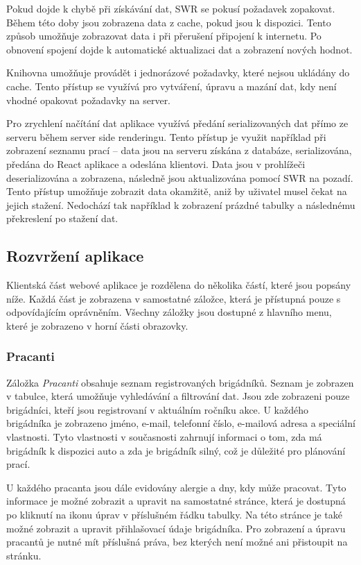 Pokud dojde k chybě při získávání dat, SWR se pokusí požadavek zopakovat. Během této doby jsou zobrazena data z cache, pokud jsou k dispozici. Tento způsob
umožňuje zobrazovat data i při přerušení připojení k internetu. Po obnovení spojení dojde k automatické aktualizaci dat a zobrazení nových hodnot.

Knihovna umožňuje provádět i jednorázové požadavky, které nejsou ukládány do cache. Tento přístup se využívá pro vytváření, úpravu a mazání dat, kdy není vhodné
opakovat požadavky na server.

Pro zrychlení načítání dat aplikace využívá předání serializovaných dat přímo ze serveru během server side renderingu. Tento přístup je využit například při
zobrazení seznamu prací -- data jsou na serveru získána z databáze, serializována, předána do React aplikace a odeslána klientovi.
Data jsou v prohlížeči deserializována a zobrazena, následně jsou aktualizována pomocí SWR na pozadí. Tento přístup umožňuje zobrazit data okamžitě, aniž by
uživatel musel čekat na jejich stažení. Nedochází tak například k zobrazení prázdné tabulky a následnému překreslení po stažení dat.

\subsection{Rozvržení aplikace}

Klientská část webové aplikace je rozdělena do několika částí, které jsou popsány níže. Každá část je zobrazena v samostatné záložce, která je přístupná
pouze s odpovídajícím oprávněním. Všechny záložky jsou dostupné z hlavního menu, které je zobrazeno v horní části obrazovky.

\subsubsection{Pracanti}

Záložka \textit{Pracanti} obsahuje seznam registrovaných brigádníků. Seznam je zobrazen v tabulce, která umožňuje vyhledávání a filtrování dat.
Jsou zde zobrazeni pouze brigádníci, kteří jsou registrovaní v aktuálním ročníku akce. U každého brigádníka je zobrazeno jméno, e-mail, telefonní číslo,
e-mailová adresa a speciální vlastnosti. Tyto vlastnosti v současnosti zahrnují informaci o tom, zda má brigádník k dispozici auto a zda je brigádník silný,
což je důležité pro plánování prací.

U každého pracanta jsou dále evidovány alergie a dny, kdy může pracovat. Tyto informace je možné zobrazit a upravit na samostatné stránce, která je dostupná
po kliknutí na ikonu úprav v příslušném řádku tabulky. Na této stránce je také možné zobrazit a upravit přihlašovací údaje brigádníka. Pro zobrazení a úpravu
pracantů je nutné mít příslušná práva, bez kterých není možné ani přistoupit na stránku.


